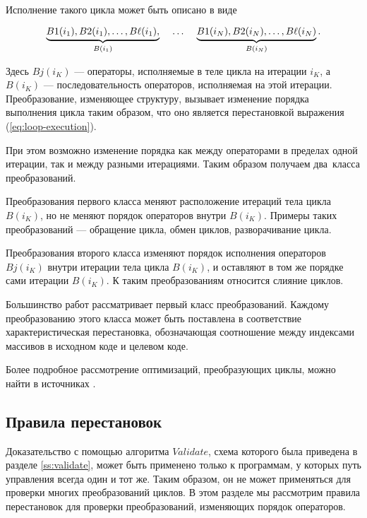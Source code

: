 Исполнение такого цикла может быть описано в виде

\begin{equation}\label{eq:loop-execution}
	\underbrace{B1(i_{1}), B2(i_{1}), \ldots, B\ell(i_{1}),}_{B(i_{1})} 
	\hspace{4mm} \ldots \hspace{4mm} 
	\underbrace{B1(i_{N}), B2(i_{N}), \ldots, B\ell(i_{N})}_{B(i_{N})}.
\end{equation}

Здесь $Bj(i_K)$ --- операторы, исполняемые в теле цикла на итерации $i_K$, а $B(i_K)$ --- последовательность операторов, исполняемая на этой итерации. Преобразование, изменяющее структуру, вызывает изменение порядка выполнения цикла таким образом, что оно является перестановкой выражения (\ref{eq:loop-execution}). 

При этом возможно изменение порядка как между операторами в пределах одной итерации, так и между разными итерациями. Таким образом получаем два~класса преобразований.

Преобразования первого класса меняют расположение итераций тела цикла $B(i_K)$, но не меняют порядок операторов внутри $B(i_K)$. Примеры таких преобразований --- обращение цикла, обмен циклов, разворачивание цикла.

Преобразования второго класса изменяют порядок исполнения операторов $Bj(i_K)$ внутри итерации тела цикла $B(i_K)$, и оставляют в том же порядке сами итерации $B(i_K)$. К таким преобразованиям относится слияние циклов.

Большинство работ рассматривает первый класс преобразований. Каждому преобразованию этого класса может быть поставлена в соответствие характеристическая перестановка, обозначающая соотношение между индексами массивов в исходном коде и целевом коде.

Более подробное рассмотрение оптимизаций, преобразующих циклы, можно найти в источниках \cite{ZuckPFGH02,Bacon}.

\subsection{Правила перестановок}

Доказательство с помощью алгоритма $Validate$, схема которого была приведена в разделе \ref{ss:validate}, может быть применено только к программам, у которых путь управления всегда один и тот же. Таким образом, он не может применяться для проверки многих преобразований циклов. В этом разделе мы рассмотрим правила перестановок для проверки преобразований, изменяющих порядок операторов.

